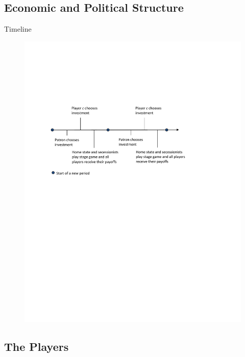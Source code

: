 \documentclass[handout]{beamer}
\begin{document}
\subsection{Economic and Political Structure}
\begin{frame}{Timeline}
\pause
\begin{figure}
\includegraphics[width=\linewidth,height=\textheight,keepaspectratio]{Timeline2.pdf}
\end{figure}
\end{frame}


\subsection{The Players}
\end{document}
